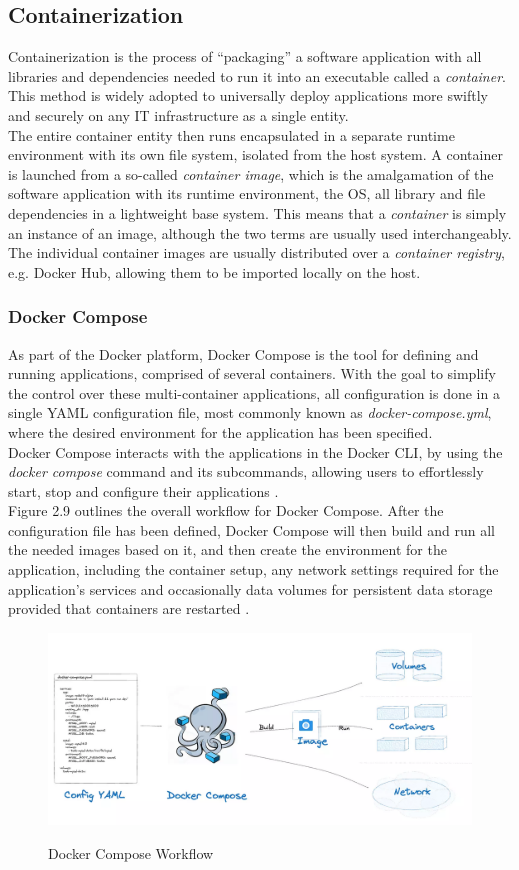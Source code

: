 \subsection{Containerization}
Containerization is the process of “packaging” a software application with all libraries and dependencies needed to run it into an executable called a \textit{container}. This method is widely adopted to universally deploy applications more swiftly and securely on any IT infrastructure as a single entity. \cite{ibm_container}\\
The entire container entity then runs encapsulated in a separate runtime environment with its own file system, isolated from the host system. A container is launched from a so-called \textit{container image}, which is the amalgamation of the software application with its runtime environment, the OS, all library and file dependencies in a lightweight base system. This means that a \textit{container} is simply an instance of an image, although the two terms are usually used interchangeably. The individual container images are usually distributed over a \textit{container registry}, e.g. Docker Hub, allowing them to be imported locally on the host. \cite{stender2020cloud}\\

\subsubsection{Docker Compose}
As part of the Docker platform, Docker Compose is the tool for defining and running applications, comprised of several containers. With the goal to simplify the control over these multi-container applications, all configuration is done in a single YAML configuration file, most commonly known as \textit{docker-compose.yml}, where the desired environment for the application has been specified. \cite{compose}\\
Docker Compose interacts with the applications in the Docker CLI, by using the \textit{docker compose} command and its subcommands, allowing users to effortlessly start, stop and configure their applications \cite{how_compose_works}.\\
Figure 2.9 outlines the overall workflow for Docker Compose. After the configuration file has been defined, Docker Compose will then build and run all the needed images based on it, and then create the environment for the application, including the container setup, any network settings required for the application's services and occasionally data volumes for persistent data storage provided that containers are restarted \cite{docker_compose_blog}.

\begin{figure}[H]
	\centering
	\includegraphics[width=0.8 \linewidth]{Images/docker-compose-flow.png}
	\caption{Docker Compose Workflow}
	\label{fig:dockerC_workflow}
    \cite{docker_compose_blog}
\end{figure}